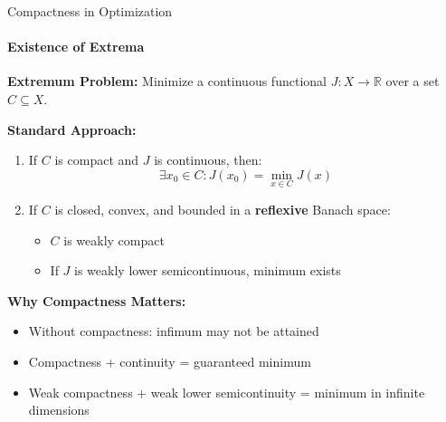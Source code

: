 \documentclass[aspectratio=169,10pt]{beamer}
\theoremstyle{definition}
\begin{document}
\begin{frame}{Compactness in Optimization}
\framesubtitle{Existence of Extrema}

\textbf{Extremum Problem:}
Minimize a continuous functional $J: X \to \mathbb{R}$ over a set $C \subseteq X$.

\vspace{0.3cm}

\textbf{Standard Approach:}
\begin{enumerate}
    \item If $C$ is compact and $J$ is continuous, then:
    \begin{equation*}
    \exists x_0 \in C : J(x_0) = \min_{x \in C} J(x)
    \end{equation*}

    \item If $C$ is closed, convex, and bounded in a \textbf{reflexive} Banach space:
    \begin{itemize}
        \item $C$ is weakly compact
        \item If $J$ is weakly lower semicontinuous, minimum exists
    \end{itemize}
\end{enumerate}

\vspace{0.3cm}

\textbf{Why Compactness Matters:}
\begin{itemize}
    \item Without compactness: infimum may not be attained
    \item Compactness + continuity = guaranteed minimum
    \item Weak compactness + weak lower semicontinuity = minimum in infinite dimensions
\end{itemize}
\end{frame}
\end{document}
